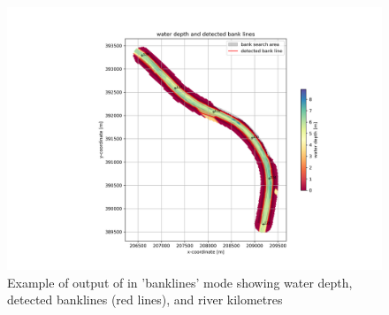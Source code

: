 \begin{figure}[!b]
\vspace*{-1cm} 
\includegraphics[width=\textwidth]{figures/1_banklinedetection.png}
\vspace*{-1cm} 
\caption{Example of output of \dfastbe in 'banklines' mode showing water depth, detected banklines (red lines), and river kilometres}
\label{Fig2.2}
\end{figure}

\pagebreak 

